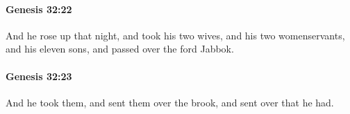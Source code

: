		\paragraph{Genesis 32:22} %
			\label{GENESIS-32-22}

			And he rose up that night, and took his two wives, and his two womenservants, and his eleven sons, and passed over the ford Jabbok.


		\paragraph{Genesis 32:23} %
			\label{GENESIS-32-23}

			And he took them, and sent them over the brook, and sent over that he had.


